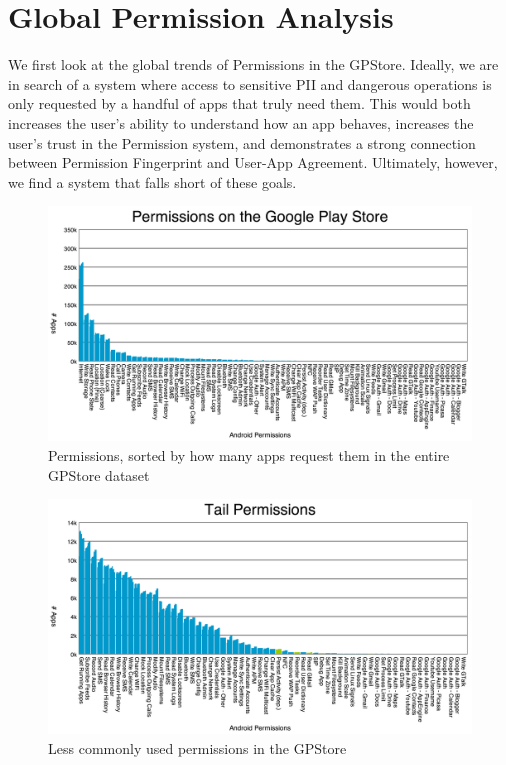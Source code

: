 
\section{Global Permission Analysis}
We first look at the global trends of Permissions in the GPStore. Ideally, we are in search of a system where access to sensitive PII and dangerous operations is only requested by a handful of apps that truly need them. This would both increases the user's ability to understand how an app behaves, increases the user's trust in the Permission system, and demonstrates a strong connection between Permission Fingerprint and User-App Agreement. Ultimately, however, we find a system that falls short of these goals.

\begin{figure}[h]
\begin{center}
\includegraphics[width=1.0\columnwidth]{figs/AllPermissions}
\caption{Permissions, sorted by how many apps request them in the entire GPStore dataset}
\label{fig:allpermissions}
\end{center}
\end{figure}

\begin{figure}[h]
\begin{center}
\includegraphics[width=1.0\columnwidth]{figs/AllPermissions_Tail}
\caption{Less commonly used permissions in the GPStore}
\label{fig:tailpermissions}
\end{center}
\end{figure}

